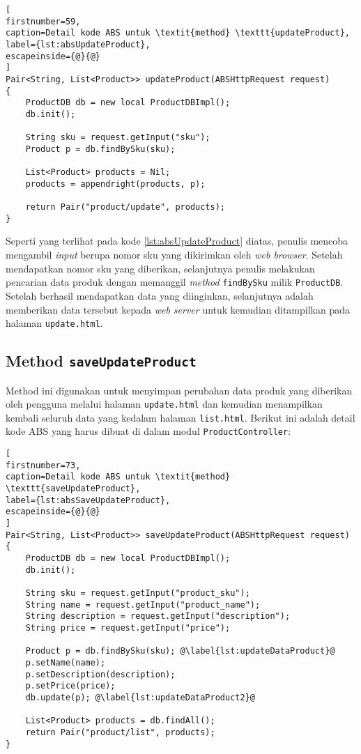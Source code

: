 \begin{lstlisting}[
firstnumber=59,
caption=Detail kode ABS untuk \textit{method} \texttt{updateProduct},
label={lst:absUpdateProduct},
escapeinside={@}{@}
]
Pair<String, List<Product>> updateProduct(ABSHttpRequest request)
{
	ProductDB db = new local ProductDBImpl();
	db.init();
	
	String sku = request.getInput("sku");
	Product p = db.findBySku(sku);
	
	List<Product> products = Nil;
	products = appendright(products, p);
	
	return Pair("product/update", products);
}
\end{lstlisting}

Seperti yang terlihat pada kode \ref{lst:absUpdateProduct} diatas, penulis mencoba mengambil \textit{input} berupa nomor sku yang dikirimkan oleh \textit{web browser}. Setelah mendapatkan nomor sku yang diberikan, selanjutnya penulis melakukan pencarian data produk dengan memanggil \textit{method} \texttt{findBySku} milik \texttt{ProductDB}. Setelah berhasil mendapatkan data yang diinginkan, selanjutnya adalah memberikan data tersebut kepada \textit{web server} untuk kemudian ditampilkan pada halaman \texttt{update.html}.

\subsection{Method \texttt{saveUpdateProduct}}

Method ini digunakan untuk menyimpan perubahan data produk yang diberikan oleh pengguna melalui halaman \texttt{update.html} dan kemudian menampilkan kembali seluruh data yang kedalam halaman \texttt{list.html}. Berikut ini adalah detail kode ABS yang harus dibuat di dalam modul \texttt{ProductController}:

\begin{lstlisting}[
firstnumber=73,
caption=Detail kode ABS untuk \textit{method} \texttt{saveUpdateProduct},
label={lst:absSaveUpdateProduct},
escapeinside={@}{@}
]
Pair<String, List<Product>> saveUpdateProduct(ABSHttpRequest request)
{
	ProductDB db = new local ProductDBImpl();
	db.init();
	
	String sku = request.getInput("product_sku");
	String name = request.getInput("product_name");
	String description = request.getInput("description");
	String price = request.getInput("price");
	
	Product p = db.findBySku(sku); @\label{lst:updateDataProduct}@
	p.setName(name);
	p.setDescription(description);
	p.setPrice(price);
	db.update(p); @\label{lst:updateDataProduct2}@
	
	List<Product> products = db.findAll();
	return Pair("product/list", products);
}
\end{lstlisting}

